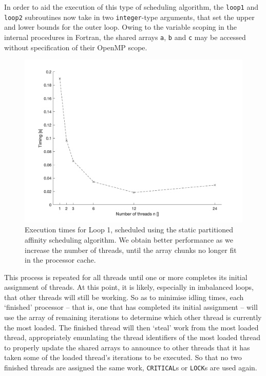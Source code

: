 \documentclass{article} %
\newcommand{\tp}{\texttt}
\begin{document}
In order to aid the execution of this type of scheduling algorithm, the \tp{loop1} and \tp{loop2} subroutines now take in two \tp{integer}-type arguments, that set the upper and lower bounds for the outer loop.
Owing to the variable scoping in the internal procedures in Fortran, the shared arrays \tp{a}, \tp{b} and \tp{c} may be accessed without specification of their OpenMP scope.

\begin{figure}
    \centering
    \includegraphics[height=.3\textheight]{part2_plots/affinity_loop1}
    \caption{Execution times for Loop 1, scheduled using the static partitioned affinity scheduling algorithm. We obtain better performance as we increase the number of threads, until the array chunks no longer fit in the processor cache.}
    \label{fig:affinityloop1}
\end{figure}

This process is repeated for all threads until one or more completes its initial assignment of threads.
At this point, it is likely, especially in imbalanced loops, that other threads will still be working.
So as to minimise idling times, each `finished' processor -- that is, one that has completed its initial assignment -- will use the array of remaining iterations to determine which other thread is currently the most loaded.
The finished thread will then `steal' work from the most loaded thread, appropriately emunlating the thread identifiers of the most loaded thread to properly update the shared arrays to announce to other threads that it has taken some of the loaded thread's iterations to be executed.
So that no two finished threads are assigned the same work, \tp{CRITICAL}s or \tp{LOCK}s are used again.
\end{document}

